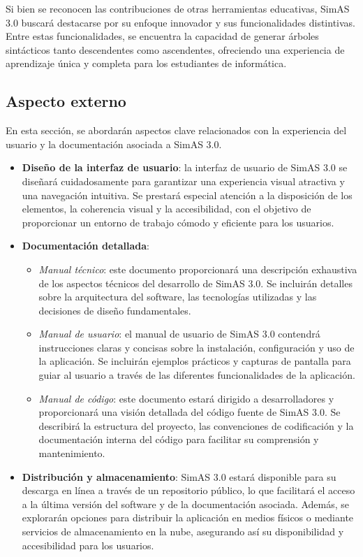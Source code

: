 Si bien se reconocen las contribuciones de otras herramientas educativas, SimAS 3.0 buscará destacarse por su enfoque innovador y sus funcionalidades distintivas. Entre estas funcionalidades, se encuentra la capacidad de generar árboles sintácticos tanto descendentes como ascendentes, ofreciendo una experiencia de aprendizaje única y completa para los estudiantes de informática.


\subsection{Aspecto externo}

En esta sección, se abordarán aspectos clave relacionados con la experiencia del usuario y la documentación asociada a SimAS 3.0.

\begin{itemize}
    \item \textbf{Diseño de la interfaz de usuario}: la interfaz de usuario de SimAS 3.0 se diseñará cuidadosamente para garantizar una experiencia visual atractiva y una navegación intuitiva. Se prestará especial atención a la disposición de los elementos, la coherencia visual y la accesibilidad, con el objetivo de proporcionar un entorno de trabajo cómodo y eficiente para los usuarios.
    
    \item \textbf{Documentación detallada}:
    \begin{itemize}
        \item \textit{Manual técnico}: este documento proporcionará una descripción exhaustiva de los aspectos técnicos del desarrollo de SimAS 3.0. Se incluirán detalles sobre la arquitectura del software, las tecnologías utilizadas y las decisiones de diseño fundamentales.
        
        \item \textit{Manual de usuario}: el manual de usuario de SimAS 3.0 contendrá instrucciones claras y concisas sobre la instalación, configuración y uso de la aplicación. Se incluirán ejemplos prácticos y capturas de pantalla para guiar al usuario a través de las diferentes funcionalidades de la aplicación.
        
        \item \textit{Manual de código}: este documento estará dirigido a desarrolladores y proporcionará una visión detallada del código fuente de SimAS 3.0. Se describirá la estructura del proyecto, las convenciones de codificación y la documentación interna del código para facilitar su comprensión y mantenimiento.
    \end{itemize}
    
    \item \textbf{Distribución y almacenamiento}: SimAS 3.0 estará disponible para su descarga en línea a través de un repositorio público, lo que facilitará el acceso a la última versión del software y de la documentación asociada. Además, se explorarán opciones para distribuir la aplicación en medios físicos o mediante servicios de almacenamiento en la nube, asegurando así su disponibilidad y accesibilidad para los usuarios.
\end{itemize}



